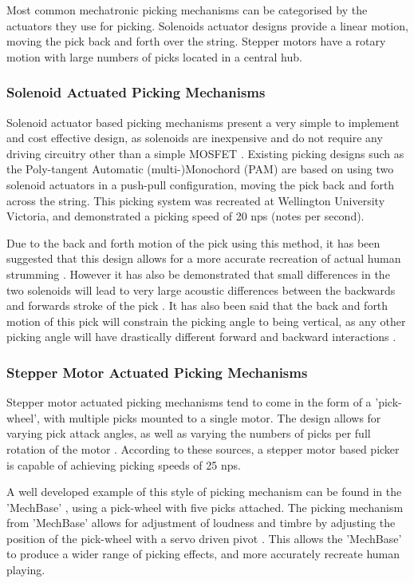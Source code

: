 \documentclass[a4paper,11pt]{article}
\begin{document}
 Most common mechatronic picking mechanisms can be categorised by the actuators they use for picking. Solenoids actuator designs provide a linear motion, moving the pick back and forth over the string. Stepper motors have a rotary motion with large numbers of picks located in a central hub. 

\subsubsection{Solenoid Actuated Picking Mechanisms}

Solenoid actuator based picking mechanisms present a very simple to implement and cost effective design, as solenoids are inexpensive and do not require any driving circuitry other than a simple MOSFET \cite{Kapur2011ACO}. Existing picking designs such as the Poly-tangent Automatic (multi-)Monochord (PAM) \cite{Rogers} are based on using two solenoid actuators in a push-pull configuration, moving the pick back and forth across the string. This picking system was recreated at Wellington University Victoria, and demonstrated a picking speed of 20 nps (notes per second).

Due to the back and forth motion of the pick using this method, it has been suggested that this design allows for a more accurate recreation of actual human strumming \cite{Placencia2020}. However it has also be demonstrated that small differences in the two solenoids will lead to very large acoustic differences between the backwards and forwards stroke of the pick \cite{Kapur2011ACO}. It has also been said that the back and forth motion of this pick will constrain the picking angle to being vertical, as any other picking angle will have drastically different forward and backward interactions \cite{Carnegie2020}. 

\subsubsection{Stepper Motor Actuated Picking Mechanisms}

Stepper motor actuated picking mechanisms tend to come in the form of a 'pick-wheel', with multiple picks mounted to a single motor. The design allows for varying pick attack angles, as well as varying the numbers of picks per full rotation of the motor \cite{YepezPlacencia2020, Carnegie2020}. According to these sources, a stepper motor based picker is capable of achieving picking speeds of 25 nps.

A well developed example of this style of picking mechanism can be found in the 'MechBase' \cite{McVay2015}, using a pick-wheel with five picks attached. The picking mechanism from 'MechBase' allows for adjustment of loudness and timbre by adjusting the position of the pick-wheel with a servo driven pivot \cite{Carnegie2020}. This allows the 'MechBase' to produce a wider range of picking effects, and more accurately recreate human playing. 
\end{document}

